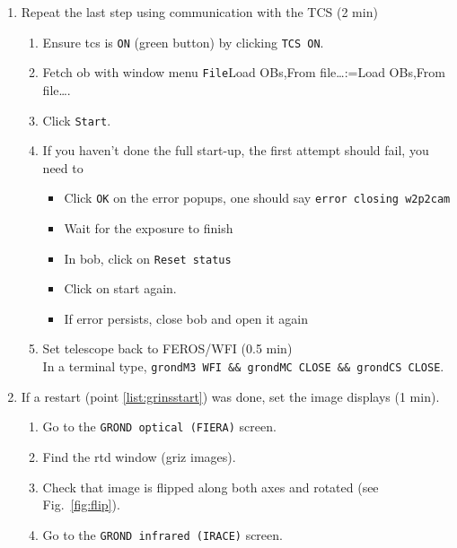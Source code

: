 \documentclass[11pt,fleqn]{book} %
\makeatletter
\def\menu#1#2{\texttt{#1}\ifx{}#2\else\@for\@x:=#2\do{$\rightarrow$\texttt{\@x}}\fi}
\def\wmenu#1#2{window menu \menu{#1}{#2}}
\makeatother
\begin{document}
\begin{enumerate}
\begin{enumerate}
\begin{enumerate}
             \item Fetch \gls{ob} with \wmenu{File}{Load OBs,From file…} 
             \item Click \texttt{Start}.
           \end{enumerate}
         \item Repeat the last step using communication with the TCS (2 min)\label{list:grond-testtcs}
           \begin{enumerate}
             \item Ensure \gls{tcs} is \texttt{ON} (green button) by clicking \texttt{TCS ON}.
             \item Fetch \gls{ob} with \wmenu{File}{Load OBs,From file…}.
             \item Click \texttt{Start}.
             \item If you haven't done the full start-up, the first attempt should fail, you need to
             \begin{itemize}
                \item Click \texttt{OK} on the error popups, one should say \texttt{error closing w2p2cam}
                \item Wait for the exposure to finish
                \item In \gls{bob}, click on \texttt{Reset status}
                \item Click on start again.
                \item If error persists, close \gls{bob} and open it again
             \end{itemize} 
             \item Set telescope back to FEROS/WFI (0.5 min)\\
             In a terminal type, \texttt{grondM3 WFI \&\& grondMC CLOSE \&\& grondCS CLOSE}.
           \end{enumerate}
         \item If a restart (point \ref{list:grinsstart}) was done, set the image displays (1 min).
            \begin{enumerate}
               \item Go to the \texttt{GROND optical (FIERA)} screen.
               \item Find the \gls{rtd} window (griz images).
               \item Check that image is flipped along both axes and rotated (see Fig.~\ref{fig:flip}).
               \item Go to the \texttt{GROND infrared (IRACE)} screen.

\end{enumerate}
\end{enumerate}
\end{enumerate}
\end{document}
